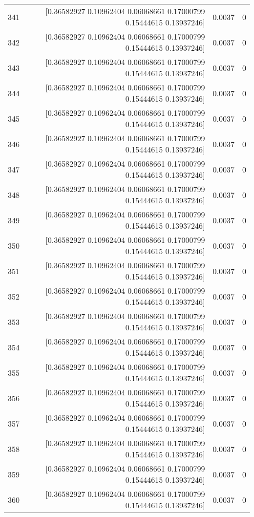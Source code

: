 \begin{longtable}{lrrr}
341 & [0.36582927 0.10962404 0.06068661 0.17000799 0.15444615 0.13937246] & 0.0037 & 0 \\
342 & [0.36582927 0.10962404 0.06068661 0.17000799 0.15444615 0.13937246] & 0.0037 & 0 \\
343 & [0.36582927 0.10962404 0.06068661 0.17000799 0.15444615 0.13937246] & 0.0037 & 0 \\
344 & [0.36582927 0.10962404 0.06068661 0.17000799 0.15444615 0.13937246] & 0.0037 & 0 \\
345 & [0.36582927 0.10962404 0.06068661 0.17000799 0.15444615 0.13937246] & 0.0037 & 0 \\
346 & [0.36582927 0.10962404 0.06068661 0.17000799 0.15444615 0.13937246] & 0.0037 & 0 \\
347 & [0.36582927 0.10962404 0.06068661 0.17000799 0.15444615 0.13937246] & 0.0037 & 0 \\
348 & [0.36582927 0.10962404 0.06068661 0.17000799 0.15444615 0.13937246] & 0.0037 & 0 \\
349 & [0.36582927 0.10962404 0.06068661 0.17000799 0.15444615 0.13937246] & 0.0037 & 0 \\
350 & [0.36582927 0.10962404 0.06068661 0.17000799 0.15444615 0.13937246] & 0.0037 & 0 \\
351 & [0.36582927 0.10962404 0.06068661 0.17000799 0.15444615 0.13937246] & 0.0037 & 0 \\
352 & [0.36582927 0.10962404 0.06068661 0.17000799 0.15444615 0.13937246] & 0.0037 & 0 \\
353 & [0.36582927 0.10962404 0.06068661 0.17000799 0.15444615 0.13937246] & 0.0037 & 0 \\
354 & [0.36582927 0.10962404 0.06068661 0.17000799 0.15444615 0.13937246] & 0.0037 & 0 \\
355 & [0.36582927 0.10962404 0.06068661 0.17000799 0.15444615 0.13937246] & 0.0037 & 0 \\
356 & [0.36582927 0.10962404 0.06068661 0.17000799 0.15444615 0.13937246] & 0.0037 & 0 \\
357 & [0.36582927 0.10962404 0.06068661 0.17000799 0.15444615 0.13937246] & 0.0037 & 0 \\
358 & [0.36582927 0.10962404 0.06068661 0.17000799 0.15444615 0.13937246] & 0.0037 & 0 \\
359 & [0.36582927 0.10962404 0.06068661 0.17000799 0.15444615 0.13937246] & 0.0037 & 0 \\
360 & [0.36582927 0.10962404 0.06068661 0.17000799 0.15444615 0.13937246] & 0.0037 & 0 \\

\end{longtable}
